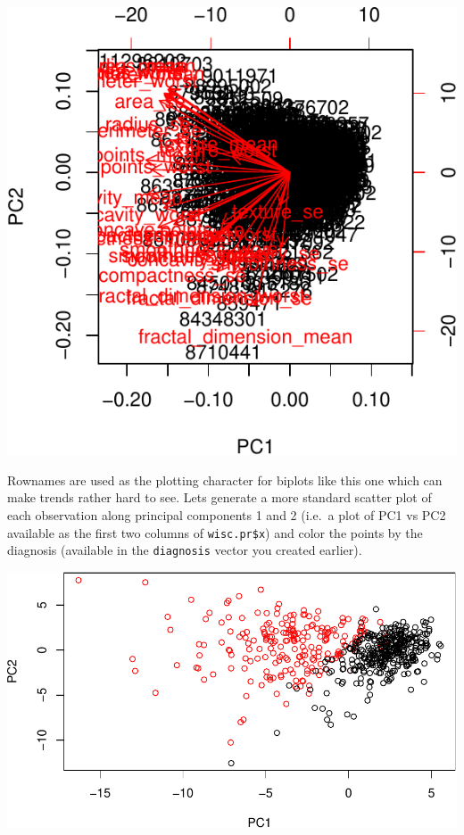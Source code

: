 \documentclass[]{article}
\begin{document}
\includegraphics{lecture9_lab_files/figure-latex/unnamed-chunk-4-1.pdf}

Rownames are used as the plotting character for biplots like this one
which can make trends rather hard to see. Lets generate a more standard
scatter plot of each observation along principal components 1 and 2
(i.e.~a plot of PC1 vs PC2 available as the first two columns of
\texttt{wisc.pr\$x}) and color the points by the diagnosis (available in
the \texttt{diagnosis} vector you created earlier).

\includegraphics{lecture9_lab_files/figure-latex/unnamed-chunk-5-1.pdf}
\end{document}
